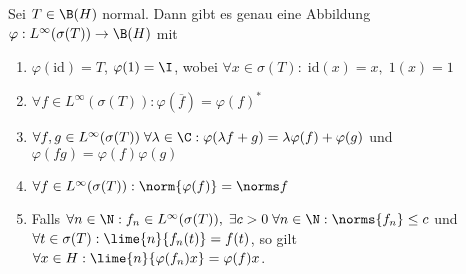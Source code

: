 \begin{theorem}
	Sei \(T\in \B(H)\) normal. Dann gibt es genau eine Abbildung \(\varphi:L^\infty(\sigma(T)) \to \B(H)\) mit \label{messb_kalk}
	\begin{enumerate}
		\item \(\varphi(\text{id}) = T\), \(\varphi(1) = \I\), wobei \(\forall x\in \sigma(T): \; \text{id}(x) = x, \;1(x) = 1\)
		\item \(\forall f\in L^\infty(\sigma(T)): \varphi(\overline f) = \varphi(f)^*\) \label{eigenschaft_mess_kalk_2}
		\item \(\forall f, g \in L^\infty(\sigma(T))\;\forall \lambda \in \C: \varphi(\lambda f + g) = \lambda \varphi(f) + \varphi(g)\)\; und \; \(\varphi(fg) = \varphi(f) \varphi(g)\)\label{eigenschaft_mess_kalk_3}
		\item \(\forall f\in L^\infty(\sigma(T)): \norm{\varphi(f)} = \norms f\) \label{eigenschaft_mess_kalk_4}
		\item Falls \(\forall n\in\N: f_n \in L^\infty(\sigma(T)),\;\exists c>0\;\forall n\in\N: \norms{f_n} \leq c\) und \(\forall t \in \sigma(T): \lime{n}{f_n(t)} = f(t)\), so gilt \(\forall x \in H: \lime{n}{\varphi(f_n)x} = \varphi(f)x\). \label{eigenschaft_mess_kalk_5}
	\end{enumerate}
\end{theorem}

